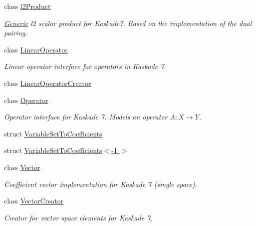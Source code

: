 \begin{DoxyCompactItemize}
class \hyperlink{classSpacy_1_1Kaskade_1_1l2Product}{l2\+Product}
\begin{DoxyCompactList}\small\item\em \hyperlink{namespaceSpacy_1_1Generic}{Generic} l2 scalar product for Kaskade7. Based on the implementation of the dual pairing. \end{DoxyCompactList}\item 
class \hyperlink{classSpacy_1_1Kaskade_1_1LinearOperator}{Linear\+Operator}
\begin{DoxyCompactList}\small\item\em Linear operator interface for operators in Kaskade 7. \end{DoxyCompactList}\item 
class \hyperlink{classSpacy_1_1Kaskade_1_1LinearOperatorCreator}{Linear\+Operator\+Creator}
\item 
class \hyperlink{classSpacy_1_1Kaskade_1_1Operator}{Operator}
\begin{DoxyCompactList}\small\item\em Operator interface for Kaskade 7. Models an operator $A:X\rightarrow Y$. \end{DoxyCompactList}\item 
struct \hyperlink{structSpacy_1_1Kaskade_1_1VariableSetToCoefficients}{Variable\+Set\+To\+Coefficients}
\item 
struct \hyperlink{structSpacy_1_1Kaskade_1_1VariableSetToCoefficients_3-1_01_4}{Variable\+Set\+To\+Coefficients$<$-\/1 $>$}
\item 
class \hyperlink{classSpacy_1_1Kaskade_1_1Vector}{Vector}
\begin{DoxyCompactList}\small\item\em Coefficient vector implementation for Kaskade 7 (single space). \end{DoxyCompactList}\item 
class \hyperlink{classSpacy_1_1Kaskade_1_1VectorCreator}{Vector\+Creator}
\begin{DoxyCompactList}\small\item\em Creator for vector space elements for Kaskade 7. \end{DoxyCompactList}\end{DoxyCompactItemize}

